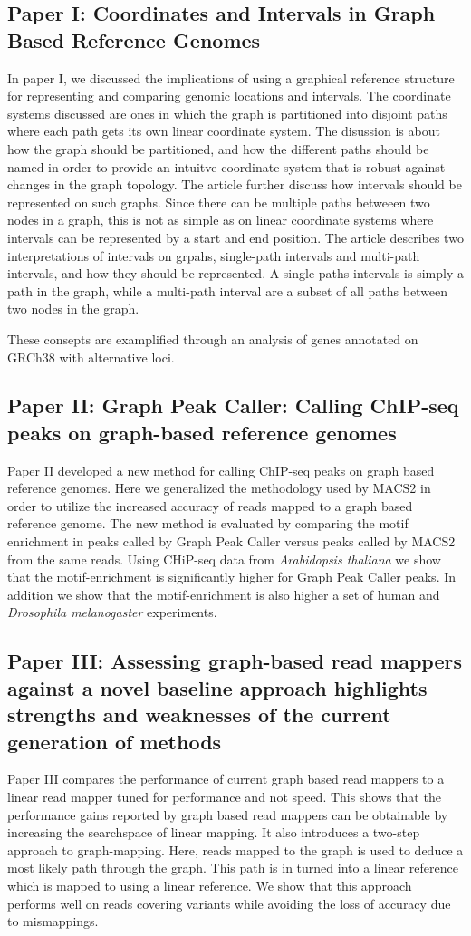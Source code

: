 \subsection{Paper I: Coordinates and Intervals in Graph Based Reference Genomes}
In paper I, we discussed the implications of using a graphical reference structure for representing and comparing genomic locations and intervals.
The coordinate systems discussed are ones in which the graph is partitioned into disjoint paths where each path gets its own linear coordinate system.
The disussion is about how the graph should be partitioned, and how the different paths should be named in order to provide an intuitve coordinate system that is robust against changes in the graph topology. 
The article further discuss how intervals should be represented on such graphs.
Since there can be multiple paths betweeen two nodes in a graph, this is not as simple as on linear coordinate systems where intervals can be represented by a start and end position.
The article describes two interpretations of intervals on grpahs, single-path intervals and multi-path intervals, and how they should be represented.
A single-paths intervals is simply a path in the graph, while a multi-path interval are a subset of all paths between two nodes in the graph. 

These consepts are examplified through an analysis of genes annotated on GRCh38 with alternative loci.
\subsection{Paper II: Graph Peak Caller: Calling ChIP-seq peaks on graph-based reference genomes}
Paper II developed a new method for calling ChIP-seq peaks on graph based reference genomes.
Here we generalized the methodology used by MACS2 in order to utilize the increased accuracy of reads mapped to a graph based reference genome.
The new method is evaluated by comparing the motif enrichment in peaks called by Graph Peak Caller versus peaks called by MACS2 from the same reads.
Using CHiP-seq data from \emph{Arabidopsis thaliana} we show that the motif-enrichment is significantly higher for Graph Peak Caller peaks.
In addition we show that the motif-enrichment is also higher a set of human and \emph{Drosophila melanogaster} experiments.

\subsection{Paper III: Assessing graph-based read mappers against a novel baseline approach highlights strengths and weaknesses of the current generation of methods}
Paper III compares the performance of current graph based read mappers to a linear read mapper tuned for performance and not speed.
This shows that the performance gains reported by graph based read mappers can be obtainable by increasing the searchspace of linear mapping.
It also introduces a two-step approach to graph-mapping.
Here, reads mapped to the graph is used to deduce a most likely path through the graph. This path is in turned into a linear reference which is mapped to using a linear reference.
We show that this approach performs well on reads covering variants while avoiding the loss of accuracy due to mismappings.

